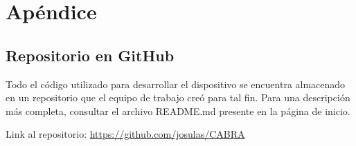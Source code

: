 \appendix

\section{Apéndice}

\subsection{Repositorio en GitHub}

Todo el código utilizado para desarrollar el dispositivo se encuentra almacenado en un repositorio que el equipo de trabajo creó para tal fin. Para una descripción más completa, consultar el archivo README.md presente en la página de inicio.

Link al repositorio: \url{https://github.com/josulas/CABRA}
